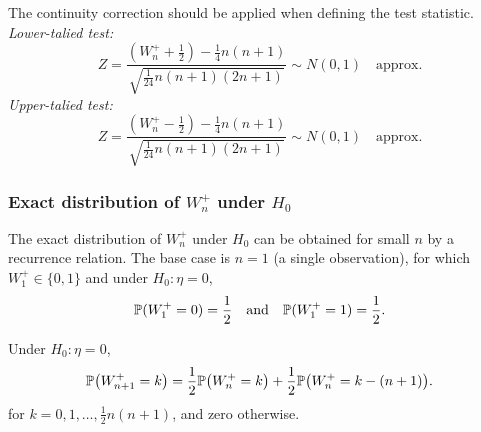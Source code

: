 The continuity correction should be applied when defining the test statistic.
\bit
\it Lower-talied test:
\[
Z = \frac{(W^{+}_n +\frac{1}{2})- \frac{1}{4}n(n+1)}{\sqrt{\frac{1}{24}n(n+1)(2n+1)}}\sim N(0,1) \quad\text{approx.}
\]
\it Upper-talied test:
\[
Z = \frac{(W^{+}_n -\frac{1}{2})- \frac{1}{4}n(n+1)}{\sqrt{\frac{1}{24}n(n+1)(2n+1)}}\sim N(0,1) \quad\text{approx.}
\]
\eit

\subsubsection{Exact distribution of $W^{+}_n$ under $H_0$}

The exact distribution of $W^{+}_n$ under $H_0$ can be obtained for small $n$ by a recurrence relation. The base case is $n=1$ (a single observation), for which $W^{+}_1\in\{0,1\}$ and under $H_0:\eta=0$,
\[
\mathbb{P}(W^{+}_1 = 0) = \frac{1}{2} \quad\text{and}\quad \mathbb{P}(W^{+}_1 = 1) = \frac{1}{2}.
\]
%
%
%

\begin{theorem}
Under $H_0:\eta=0$,
\[
\mathbb{P}\big(W^{+}_{n+1}=k\big) = \frac{1}{2}\mathbb{P}\big(W^{+}_n=k\big) + \frac{1}{2}\mathbb{P}\big(W^{+}_n=k-(n+1)\big).
\]
for $k=0,1,\ldots,\frac{1}{2}n(n+1)$, and zero otherwise.
\end{theorem}

